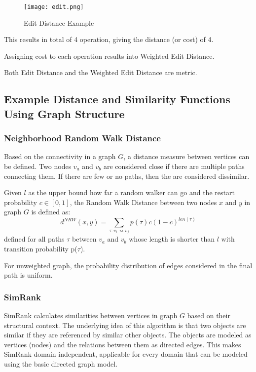 \begin{figure}[ht]
	\centering
	\texttt{[image: edit.png]}
	\caption{Edit Distance Example} 
	\label{fig:edit}
\end{figure}
This results in total of 4 operation, giving the distance (or cost) of 4.

Assigning cost to each operation results into Weighted Edit Distance\cite{Chen:2004:MLE:1316689.1316758}.

Both Edit Distance and the Weighted Edit Distance are metric.

\subsection{Example Distance and Similarity Functions Using Graph Structure}

\subsubsection{Neighborhood Random Walk Distance}

Based on the connectivity in a graph $G$, a distance measure between vertices can be defined. 
Two nodes $v_{a}$ and $v_{b}$ are considered close if there are multiple paths connecting them. 
If there are few or no paths, then the are considered dissimilar.

\begin{definition}
	Given $l$ as the upper bound how far a random walker can go and the restart probability $c \in [0, 1]$, 
the Random Walk Distance between two nodes  $x$ and $y$ in graph $G$ is defined as:
\begin{equation}
	d^{NRW}(x,y) = \sum_{\tau:v_{i}\rightsquigarrow v_{j}}p(\tau)c(1-c)^{len(\tau)}
\end{equation}
defined for all paths $\tau$ between $v_{a}$ and $v_{b}$ whose length is shorter than $l$ with transition probability p($\tau$). 
\end{definition}

For unweighted graph, the probability distribution of edges considered in the final path is uniform.

\subsubsection{SimRank}
SimRank calculates similarities between vertices in graph $G$ based on their structural context\cite{Jeh02simrank:a}.
The underlying idea of this algorithm is that two objects are similar if they are referenced by similar other objects. 
The objects are modeled as vertices (nodes) and the relations between them as directed edges.
This makes SimRank domain independent, applicable for every domain that can be modeled using the basic directed graph model.


